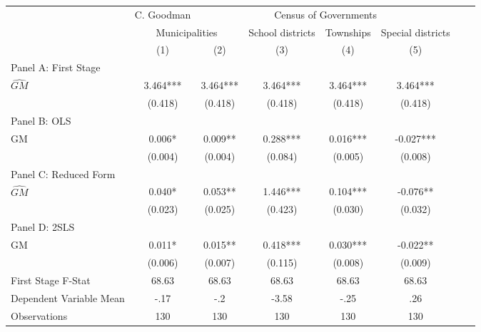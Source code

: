  \begin{tabular}{l*{7}{c}} \toprule
&\multicolumn{1}{c}{C. Goodman}&\multicolumn{4}{c}{Census of Governments}\\\cmidrule(lr){2-2}\cmidrule(lr){3-6}
&\multicolumn{2}{c}{Municipalities}&\multicolumn{1}{c}{School districts}&\multicolumn{1}{c}{Townships}&\multicolumn{1}{c}{Special districts}\\\cmidrule(lr){2-3}\cmidrule(lr){4-6}
&\multicolumn{1}{c}{(1)}&\multicolumn{1}{c}{(2)}&\multicolumn{1}{c}{(3)}&\multicolumn{1}{c}{(4)}&\multicolumn{1}{c}{(5)}\\
\cmidrule(lr){1-6}
\multicolumn{5}{l}{Panel A: First Stage}\\
\cmidrule(lr){1-6}
$\widehat{GM}$  &    3.464***&    3.464***&    3.464***&    3.464***&    3.464***\\
                &  (0.418)   &  (0.418)   &  (0.418)   &  (0.418)   &  (0.418)   \\
\cmidrule(lr){1-6}
\multicolumn{5}{l}{Panel B: OLS}\\
\cmidrule(lr){1-6}
GM              &    0.006*  &    0.009** &    0.288***&    0.016***&   -0.027***\\
                &  (0.004)   &  (0.004)   &  (0.084)   &  (0.005)   &  (0.008)   \\
\cmidrule(lr){1-6}
\multicolumn{5}{l}{Panel C: Reduced Form}\\
\cmidrule(lr){1-6}
$\widehat{GM}$  &    0.040*  &    0.053** &    1.446***&    0.104***&   -0.076** \\
                &  (0.023)   &  (0.025)   &  (0.423)   &  (0.030)   &  (0.032)   \\
\cmidrule(lr){1-6}
\multicolumn{5}{l}{Panel D: 2SLS}\\
\cmidrule(lr){1-6}
GM              &    0.011*  &    0.015** &    0.418***&    0.030***&   -0.022** \\
                &  (0.006)   &  (0.007)   &  (0.115)   &  (0.008)   &  (0.009)   \\
\midrule
First Stage F-Stat&    68.63   &    68.63   &    68.63   &    68.63   &    68.63   \\
Dependent Variable Mean&     -.17   &      -.2   &    -3.58   &     -.25   &      .26   \\
Observations    &      130   &      130   &      130   &      130   &      130   \\
       \bottomrule \end{tabular}
